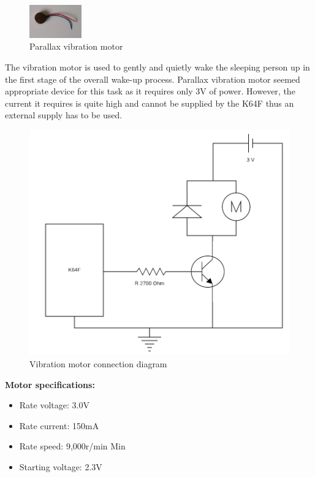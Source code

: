 \documentclass[12pt,a4paper]{article}
\begin{document}
		\begin{figure}
			\centering
			\includegraphics[width=0.2\textwidth]{parallax_vib_mot1.jpg}
			\caption{Parallax vibration motor}
		\end{figure}
		
		The vibration motor is used to gently and quietly wake the sleeping person up in the first stage of the overall wake-up process. Parallax vibration motor seemed appropriate device for this task as it requires only 3V of power. However, the current it requires is quite high and cannot be supplied by the K64F thus an external supply has to be used.\\
		
		\begin{figure}[h]
			\centering
			\includegraphics[scale=0.3]{motor_diag1.png}
			\caption{Vibration motor connection diagram}
		\end{figure}

		{\bfseries Motor specifications:}
		\begin{itemize}
			\item Rate voltage: 3.0V
			\item Rate current: 150mA
			\item Rate speed: 9,000r/min Min
			\item Starting voltage: 2.3V
		\end{itemize}
\end{document}
